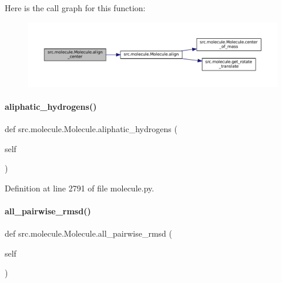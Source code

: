 Here is the call graph for this function\+:
\nopagebreak
\begin{figure}[H]
\begin{center}
\leavevmode
\includegraphics[width=350pt]{classsrc_1_1molecule_1_1Molecule_a42c302c3f922e6f89862f2e5d39514a6_cgraph}
\end{center}
\end{figure}
\mbox{\label{classsrc_1_1molecule_1_1Molecule_ab2a58903fe3c7522158165619b92fab2}} 
\paragraph{\texorpdfstring{aliphatic\+\_\+hydrogens()}{aliphatic\_hydrogens()}}
{\footnotesize\ttfamily def src.\+molecule.\+Molecule.\+aliphatic\+\_\+hydrogens (\begin{DoxyParamCaption}\item[{}]{self }\end{DoxyParamCaption})}



Definition at line 2791 of file molecule.\+py.

\mbox{\label{classsrc_1_1molecule_1_1Molecule_ac2da956804fed7a98341c94582838f26}} 
\paragraph{\texorpdfstring{all\+\_\+pairwise\+\_\+rmsd()}{all\_pairwise\_rmsd()}}
{\footnotesize\ttfamily def src.\+molecule.\+Molecule.\+all\+\_\+pairwise\+\_\+rmsd (\begin{DoxyParamCaption}\item[{}]{self }\end{DoxyParamCaption})}



